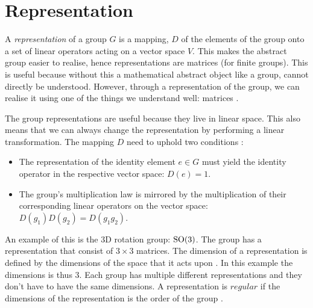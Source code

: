 \section{Representation} \label{app:repersentations}
A \textit{representation} of a group $G$ is a mapping, $D$ of the elements of the group onto a set of linear operators acting on a vector space $V$. This makes the abstract group easier to realise, hence representations are matrices (for finite groups). This is useful because without this a mathematical abstract object like a group, cannot directly be understood. However, through a representation of the group, we can realise it using one of the things we understand well: matrices \cite{Georgi:1999wka}. 

The group representations are useful because they live in linear space. This also means that we can always change the representation by performing a linear transformation. The mapping $D$ need to uphold two conditions \cite{Georgi:1999wka}:
\begin{itemize}
    \item The representation of the identity element $e\in G$ must yield the identity operator in the respective vector space: $D(e)=1$. 
    \item The group's multiplication law is mirrored by the multiplication of their corresponding linear operators on the vector space: $D(g_1)D(g_2)=D(g_1g_2)$.
\end{itemize}
An example of this is the 3D rotation group: $\mathrm{SO}(3)$. The group has a representation that consist of $3\times 3$ matrices. The dimension of a representation is defined by the dimensions of the space that it acts upon \cite{Georgi:1999wka}. In this example the dimensions is thus $3$. Each group has multiple different representations and they don't have to have the same dimensions. A representation is $\textit{regular}$ if the dimensions of the representation is the order of the group \cite{Georgi:1999wka}. 

